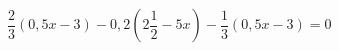 \begin{ex}
	\begin{condition}
		\( \dfrac{2}{3}(0,5x-3)-0,2\left( 2\dfrac{1}{2}-5x \right)-\dfrac{1}{3}(0,5x-3)=0 \)
	\end{condition}
\end{ex}
